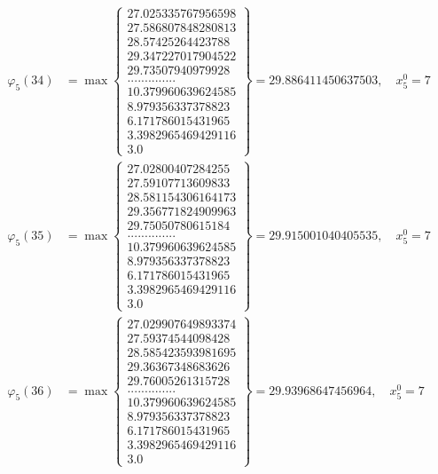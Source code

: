 \documentclass{article}
\begin{document}
\begin{align*}
  
  
  
\varphi_{5}(34) &= \max \left\{ \begin{array}{c}
27.025335767956598 \\
 27.586807848280813 \\
 28.57425264423788 \\
 29.347227017904522 \\
 29.73507940979928 \\
 .............. \\
 10.379960639624585 \\
 8.979356337378823 \\
 6.171786015431965 \\
 3.3982965469429116 \\
 3.0
\end{array} \right\} = 29.886411450637503, \quad x_{5}^0 = 7\\
  
  
  
  
\varphi_{5}(35) &= \max \left\{ \begin{array}{c}
27.02800407284255 \\
 27.59107713609833 \\
 28.581154306164173 \\
 29.356771824909963 \\
 29.75050780615184 \\
 .............. \\
 10.379960639624585 \\
 8.979356337378823 \\
 6.171786015431965 \\
 3.3982965469429116 \\
 3.0
\end{array} \right\} = 29.915001040405535, \quad x_{5}^0 = 7\\
  
  
  
  
\varphi_{5}(36) &= \max \left\{ \begin{array}{c}
27.029907649893374 \\
 27.59374544098428 \\
 28.585423593981695 \\
 29.36367348683626 \\
 29.76005261315728 \\
 .............. \\
 10.379960639624585 \\
 8.979356337378823 \\
 6.171786015431965 \\
 3.3982965469429116 \\
 3.0
\end{array} \right\} = 29.93968647456964, \quad x_{5}^0 = 7\\
  
  
\end{align*}
\end{document}
